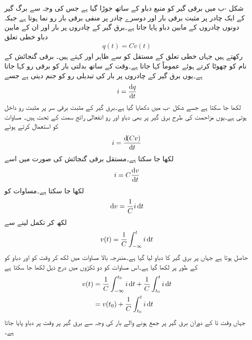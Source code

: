 شکل -ب میں برقی گیر کو  منبع دباو کے ساتھ جوڑا گیا ہے  جس کی وجہ سے برگ گیر کے ایک چادر پر مثبت برقی بار  اور دوسرے چادر پر منفی برقی بار  رو نما ہوتا ہے جبکہ دونوں چادروں کے مابین دباو  پایا جاتا ہے۔برق گیر کے چادروں پر بار اور ان کے مابین دباو خطی تعلق
\begin{align}\label{مساوات_امالہ_بار_دباو_تعلق}
q(t)=C v(t)
\end{align}
رکھتے ہیں جہاں خطی تعلق کے مستقل کو  سے ظاہر اور   کہتے ہیں۔ برقی گنجائش کے نام کو چھوٹا کرتے ہوئے عموماً  کہا جاتا ہے۔وقت کے ساتھ بدلتی بار کو برقی رو کہا جاتا ہے۔یوں برق گیر کے چادروں پر بار کی تبدیلی رو کو جنم دیتی ہے جسے
\begin{align}
i=\frac{\dif q}{\dif t}
\end{align}
لکھا جا سکتا ہے جسے شکل -ب میں دکھایا گیا ہے۔برق گیر کے مثبت برقی سر پر مثبت رو داخل ہوتی ہے۔یوں مزاحمت کی طرح  برق گیر پر بھی دباو اور رو انفعالی رائج سمت کے تحت ہیں۔ مساوات  کو استعمال کرتے ہوئے 
\begin{align}
i=\frac{\dif (C v)}{\dif t}
\end{align}
لکھا جا سکتا ہے۔مستقل برقی گنجائش کی صورت میں اسے
\begin{align}\label{مساوات_امالہ_بار_دباو_تعلق_ب}
i=C\frac{\dif v}{\dif t}
\end{align}
لکھا جا سکتا ہے۔مساوات  کو
\begin{align*}
\dif v = \frac{1}{C} i \dif t
\end{align*}
لکھ کر تکمل لینے سے
\begin{align}\label{مساوات_امالہ_بار_دباو_تعلق_پ}
v(t)=\frac{1}{C} \int_{-\infty}^{t} i \dif t
\end{align}
حاصل ہوتا ہے جہاں  پر برق گیر کا دباو  لیا گیا ہے۔مندرجہ بالا مساوات میں  لکھ کر وقت کو  اور دباو کو  کے طور پر لکھا گیا ہے۔اس مساوات کو دو ٹکڑوں میں درج ذیل لکھا جا سکتا ہے
\begin{gather}
\begin{aligned}\label{مساوات_امالہ_ابتدائی_دباو_الف}
v(t)&=\frac{1}{C} \int_{-\infty}^{t_0} i \dif t+\frac{1}{C} \int_{t_0}^{t} i \dif t\\
&=v(t_0)+\frac{1}{C} \int_{t_0}^{t} i \dif t
\end{aligned}
\end{gather}
جہاں وقت  تا  کے دوران برق گیر پر جمع ہونے والے بار کی وجہ سے  برق گیر پر وقت  پر دباو  پایا جاتا ہے۔ 

